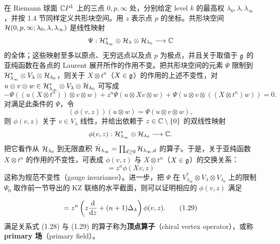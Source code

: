 在 Riemann 球面 $\mathbb{C}P^1$ 上的三点 $0,p,\infty$ 处，分别给定 level $k$ 的最高权 $\lambda_0,\lambda,\lambda_\infty$，并按 1.4 节同样定义共形块空间。用 $z$ 表示点 $p$ 的坐标。共形块空间 $\mathcal{H}(0,p,\infty;\lambda_0,\lambda,\lambda_\infty)$ 是线性映射
\[
\Psi:\mathcal{H}_{\lambda_\infty}^{*}\otimes\mathcal{H}_{\lambda}\otimes\mathcal{H}_{\lambda_0}\longrightarrow\mathbb{C}
\]
的全体；这些映射至多以原点、无穷远点以及点 $p$ 为极点，并且关于取值于 $\mathfrak{g}$ 的亚纯函数在各点的 Laurent 展开所作的作用不变。把共形块空间的元素 $\Psi$ 限制到 $\mathcal{H}_{\lambda_\infty}^{*}\otimes V_\lambda\otimes\mathcal{H}_{\lambda_0}$，则关于 $X\otimes t^n$（$X\in\mathfrak{g}$）的作用的上述不变性，对 $u\otimes v\otimes w\in\mathcal{H}_{\lambda_\infty}^{*}\otimes V_\lambda\otimes\mathcal{H}_{\lambda_0}$ 可写成
\[
-\Psi((u(X\otimes t^n))\otimes v\otimes w)+z^{n}\Psi(u\otimes Xv\otimes w)
+\Psi(u\otimes v\otimes((X\otimes t^n)w))=0 .
\]
对满足此条件的 $\Psi$，令
\[
(\phi(v,z))(u\otimes w)=\Psi(u\otimes v\otimes w),
\]
则 $\phi(v,z)$ 关于 $v\in V_\lambda$ 线性，并给出依赖于 $z\in\mathbb{C}\setminus\{0\}$ 的双线性映射
\[
\phi(v,z):\mathcal{H}_{\lambda_\infty}^{*}\otimes\mathcal{H}_{\lambda_0}\longrightarrow\mathbb{C} .
\]
把它看作从 $\mathcal{H}_{\lambda_0}$ 到无限直积 $\bar{\mathcal{H}}_{\lambda_\infty}=\prod_{d\ge 0}\mathcal{H}_{\lambda_\infty,d}$ 的算子。于是，关于亚纯函数 $X\otimes t^n$ 的作用的不变性，可表成 $\phi(v,z)$ 与 $X\otimes t^n$（$X\in\mathfrak{g}$）的交换关系：
\begin{equation}
  [X\otimes t^n,\phi(v,z)]=z^{n}\phi(Xv,z) \tag{1.28}
\end{equation}
这称为规范不变性（gauge invariance）。进一步，把 $\Psi$ 在 $V_{\lambda_\infty}^{*}\otimes V_\lambda\otimes V_{\lambda_0}$ 上的限制 $\Psi_0$ 取作前一节导出的 KZ 联络的水平截面，则可以证明相应的 $\phi(v,z)$ 满足


\begin{equation}
  [L_n,\phi(v,z)]=z^{n}\left(z\frac{\rd}{\rd z}+(n+1)\Delta_\lambda\right)\phi(v,z). \tag{1.29}
\end{equation}
满足关系式 (1.28) 与 (1.29) 的算子称为\textbf{顶点算子}（chiral vertex operator），或称 \textbf{primary 场}（primary field）。


